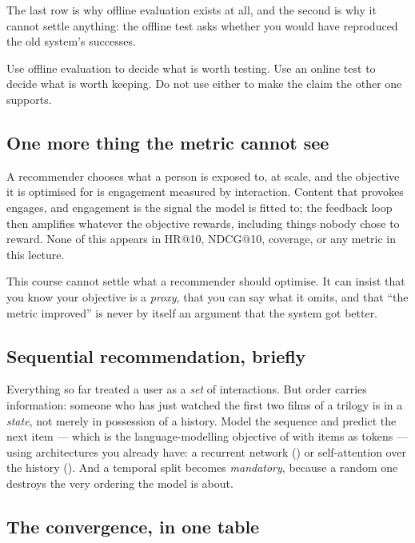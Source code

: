 \documentclass[11pt,a4paper]{article}
\begin{document}
The last row is why offline evaluation exists at all, and the second is why it
cannot settle anything: the offline test asks whether you would have reproduced
the old system's successes.

\begin{keybox}[title={The honest position}]
Use offline evaluation to decide what is worth testing. Use an online test to
decide what is worth keeping. Do not use either to make the claim the other one
supports.
\end{keybox}

\subsection{One more thing the metric cannot see}

A recommender chooses what a person is exposed to, at scale, and the objective
it is optimised for is engagement measured by interaction. Content that
provokes engages, and engagement is the signal the model is fitted to; the
feedback loop then amplifies whatever the objective rewards, including things
nobody chose to reward. None of this appears in HR@10, NDCG@10, coverage, or
any metric in this lecture.

This course cannot settle what a recommender should optimise. It can insist
that you know your objective is a \emph{proxy}, that you can say what it omits,
and that ``the metric improved'' is never by itself an argument that the system
got better.

\subsection{Sequential recommendation, briefly}

Everything so far treated a user as a \emph{set} of interactions. But order
carries information: someone who has just watched the first two films of a
trilogy is in a \emph{state}, not merely in possession of a history. Model the
sequence and predict the next item --- which is the language-modelling
objective of  with items as tokens --- using architectures you
already have: a recurrent network () or self-attention over the
history (). And a temporal split becomes \emph{mandatory}, because
a random one destroys the very ordering the model is about.

\subsection{The convergence, in one table}
\end{document}
